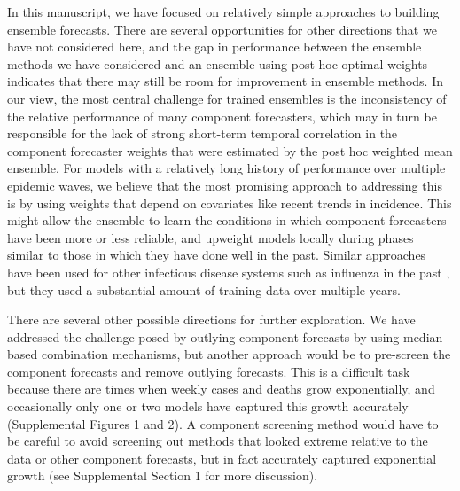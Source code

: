 \documentclass[11pt,3p,authoryear]{elsarticle}
\begin{document}

In this manuscript, we have focused on relatively simple approaches to building ensemble forecasts. There are several opportunities for other directions that we have not considered here, and the gap in performance between the ensemble methods we have considered and an ensemble using post hoc optimal weights indicates that there may still be room for improvement in ensemble methods.
In our view, the most central challenge for trained ensembles is the inconsistency of the relative performance of many component forecasters, which may in turn be responsible for the lack of strong short-term temporal correlation in the component forecaster weights that were estimated by the post hoc weighted mean ensemble. For models with a relatively long history of performance over multiple epidemic waves, we believe that the most promising approach to addressing this is by using weights that depend on covariates like recent trends in incidence. This might allow the ensemble to learn the conditions in which component forecasters have been more or less reliable, and upweight models locally during phases similar to those in which they have done well in the past. Similar approaches have been used for other infectious disease systems such as influenza in the past \citep[e.g.,][]{ray_feature_weighted_ensembles}, but they used a substantial amount of training data over multiple years.

There are several other possible directions for further exploration.
We have addressed the challenge posed by outlying component forecasts by using median-based combination mechanisms, but another approach would be to pre-screen the component forecasts and remove outlying forecasts. This is a difficult task because there are times when weekly cases and deaths grow exponentially, and occasionally only one or two models have captured this growth accurately (Supplemental Figures 1 and 2).
A component screening method would have to be careful to avoid screening out methods that looked extreme relative to the data or other component forecasts, but in fact accurately captured exponential growth (see Supplemental Section 1 for more discussion).
\end{document}
